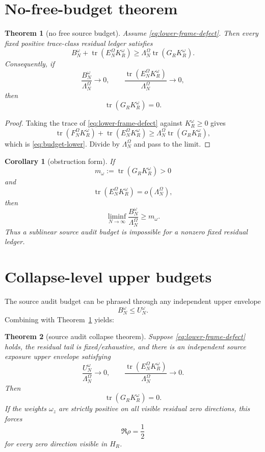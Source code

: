 \documentclass[11pt]{article}
\newtheorem{theorem}{Theorem}
\newtheorem{corollary}{Corollary}
\newcommand{\tr}{\operatorname{tr}}
\begin{document}
\section{No-free-budget theorem}
\begin{theorem}[no free source budget]\label{thm:no-free}
Assume \eqref{eq:lower-frame-defect}.  Then every fixed positive trace-class residual ledger satisfies
\begin{equation}\label{eq:budget-lower}
  B_N^\omega + \tr(E_N^\Omega K_R^\omega)
  \ge
  \Lambda_N^\Omega\tr(G_RK_R^\omega).
\end{equation}
Consequently, if
\[
  \frac{B_N^\omega}{\Lambda_N^\Omega}\to0,
  \qquad
  \frac{\tr(E_N^\Omega K_R^\omega)}{\Lambda_N^\Omega}\to0,
\]
then
\[
  \boxed{\tr(G_RK_R^\omega)=0.}
\]
\end{theorem}

\begin{proof}
Taking the trace of \eqref{eq:lower-frame-defect} against \(K_R^\omega\ge0\) gives
\[
  \tr(F_N^\Omega K_R^\omega)+\tr(E_N^\Omega K_R^\omega)
  \ge
  \Lambda_N^\Omega\tr(G_RK_R^\omega),
\]
which is \eqref{eq:budget-lower}.  Divide by \(\Lambda_N^\Omega\) and pass to the limit.
\end{proof}

\begin{corollary}[obstruction form]\label{cor:obstruction}
If
\[
  m_\omega:=\tr(G_RK_R^\omega)>0
\]
and
\[
  \tr(E_N^\Omega K_R^\omega)=o(\Lambda_N^\Omega),
\]
then
\[
  \liminf_{N\to\infty}\frac{B_N^\omega}{\Lambda_N^\Omega}\ge m_\omega.
\]
Thus a sublinear source audit budget is impossible for a nonzero fixed residual ledger.
\end{corollary}

\section{Collapse-level upper budgets}
The source audit budget can be phrased through any independent upper envelope
\[
  B_N^\omega\le U_N^\omega.
\]
Combining with Theorem~\ref{thm:no-free} yields:

\begin{theorem}[source audit collapse theorem]\label{thm:source-audit-collapse}
Suppose \eqref{eq:lower-frame-defect} holds, the residual tail is fixed/exhaustive, and there is an independent source exposure upper envelope satisfying
\[
  \frac{U_N^\omega}{\Lambda_N^\Omega}\to0,
  \qquad
  \frac{\tr(E_N^\Omega K_R^\omega)}{\Lambda_N^\Omega}\to0.
\]
Then
\[
  \tr(G_RK_R^\omega)=0.
\]
If the weights \(\omega_z\) are strictly positive on all visible residual zero directions, this forces
\[
  \Re\rho=\frac12
\]
for every zero direction visible in \(H_R\).
\end{theorem}
\end{document}
